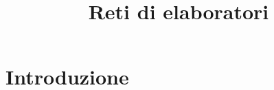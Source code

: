 
\usepackage{algorithm}
\usepackage{algpseudocode}

\renewcommand{\algorithmicrequire}{\textbf{Input:}}
\renewcommand{\algorithmicensure}{\textbf{Output:}}



\title{Reti di elaboratori}

\maketitle

\newpage

\tableofcontents
\newpage

\chapter{Introduzione}



\newpage

